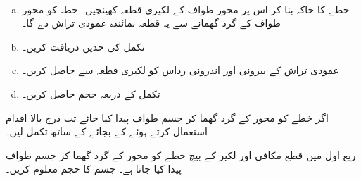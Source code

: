 \\
\begin{enumerate}[a.]
\item
خطے کا خاکہ بنا کر اس پر محور طواف کے  لکیری قطعہ کھینچیں۔ خطہ کو محور طواف کے گرد گھمانے سے یہ قطعہ  نمائندہ عمودی تراش دے گا۔
\item
تکمل کی حدیں دریافت کریں۔
\item
عمودی تراش کے بیرونی اور اندرونی رداس کو لکیری قطعہ  سے حاصل کریں۔
\item
تکمل کے  ذریعہ حجم حاصل کریں۔
\end{enumerate}

اگر خطے کو محور  کے گرد گھما کر جسم طواف پیدا کیا جائے تب درج بالا اقدام استعمال کرتے ہوئے  کے بجائے  کے ساتھ تکمل لیں۔

ربع اول میں قطع مکافی  اور لکیر   کے بیچ خطے کو   محور کے گرد گھما کر جسم طواف پیدا کیا جاتا ہے۔ جسم کا حجم معلوم کریں۔

